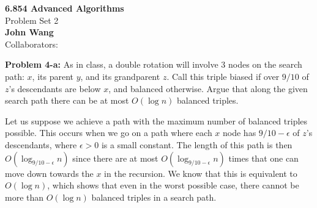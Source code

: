 \documentclass[psamsfonts]{amsart}
\newenvironment{sol}{\vspace{0.25cm}{\large \bfseries Solution:}}{\qedsymbol}
\newenvironment{prob}[1]{\begin{framed}{\large \bfseries Problem #1:}}{\end{framed}}
\newcommand{\makenewtitle}{
\begin{center}
{\huge \bfseries 6.854 Advanced Algorithms} \\
Problem Set 2\\
\vspace{0.25cm}
{\bfseries John Wang} \\
Collaborators:
\end{center}
\vspace{0.5cm}
}
\begin{document}
\newpage
\makenewtitle

\begin{prob}{4-a}
As in class, a double rotation will involve 3 nodes on the search path: $x$, its parent $y$, and its grandparent $z$. Call this triple biased if over $9/10$ of $z$'s descendants are below $x$, and balanced otherwise. Argue that along the given search path there can be at most $O(\log n)$ balanced triples.
\end{prob}
\begin{sol}
Let us suppose we achieve a path with the maximum number of balanced triples possible. This occurs when we go on a path where each $x$ node has $9/10 - \epsilon$ of $z$'s descendants, where $\epsilon > 0$ is a small constant. The length of this path is then $O(\log_{9/10-\epsilon}n)$ since there are at most $O(\log_{9/10 - \epsilon}n)$ times that one can move down towards the $x$ in the recursion. We know that this is equivalent to $O(\log n)$, which shows that even in the worst possible case, there cannot be more than $O(\log n)$ balanced triples in a search path.
\end{sol}
\end{document}
